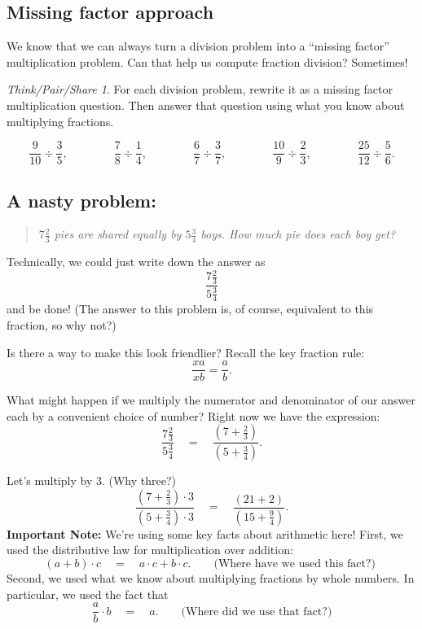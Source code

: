 \documentclass[10pt, reqno]{amsart}
\theoremstyle{remark}
\newtheorem*{thinkpair*}{Think/Pair/Share}
\theoremstyle{definition}
\numberwithin{equation}{section}  %
\begin{document}
\subsection{Missing factor approach}
We know that we can always turn a division problem into a ``missing factor'' multiplication problem.  Can that help us compute fraction division?  Sometimes!

\begin{thinkpair*}
For each division problem, rewrite it as a missing factor multiplication question.  Then answer that  question using what you know about multiplying fractions.

\[
\frac{9}{10} \div \frac{3}{5},
\qquad\qquad
\frac 7 8  \div \frac 1 4,
\qquad\qquad
\frac 6 7  \div \frac 3 7,
\qquad\qquad
\frac{10}9 \div \frac 2 3,
\qquad\qquad
\frac{25}{12} \div \frac 5 6.
\]


\end{thinkpair*}


\subsection*{A nasty problem:}

\begin{quotation}
\emph{$7\frac 2 3$ 
pies are  shared equally by $5\frac 34$ boys.
 How much pie does each boy get?
} \end{quotation}


Technically, we could just write down the answer as
\[
\frac{7\frac 2 3}{5\frac 34}
\]
and be done! (The answer to this problem is, of course, equivalent to this fraction, so why not?) 

Is there a way to make this look
friendlier?
Recall the key fraction rule:
\[
\frac{xa}{xb} = \frac a b.
\]

What might happen if we multiply the numerator and denominator of our answer each by a convenient
choice of number? Right now we have the expression:
\[
\frac{7\frac 2 3}{5\frac 34}
\quad
=
\quad
\frac{\left(7+\frac 2 3\right)}{\left(5+ \frac 34\right)}.
\]

Let's multiply by 3. (Why three?)
\[
\frac{\left(7+\frac 2 3\right)\cdot 3}{\left(5+ \frac 34\right)\cdot 3}
\quad
=
\quad
\frac{\left(21+2\right)}{\left(15+ \frac 94\right)}.
\]
{\bf Important Note:} We're using some key facts about arithmetic here!  First, we used the distributive law for multiplication over addition: 
\[
(a+b)\cdot c 
\quad
= 
\quad
a\cdot c + b\cdot c. \qquad \text{(Where have we used this fact?) }
\]   Second, we used what we know about multiplying fractions by whole numbers.  In particular, we used the fact that 
\[
\frac a b \cdot b
\quad
 = 
 \quad
 a.\qquad  \text{(Where did we use that fact?)}
\]
\end{document}
